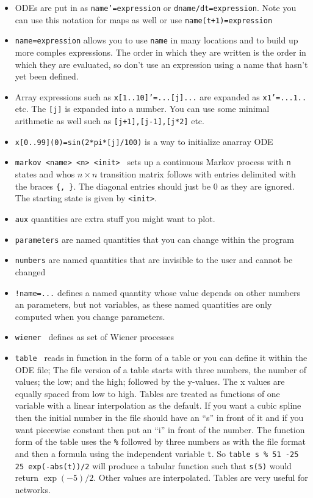 \begin{itemize}\itemsep -.05in
\item ODEs are put in as {\tt name'=expression} or {\tt dname/dt=expression}. Note you can use this notation for maps as well or use {\tt name(t+1)=expression}
\item {\tt name=expression} allows you to use {\tt name} in many locations and to build up more comples expressions. The order in which they are written is the order in which they are evaluated, so don't use an expression using a name that hasn't yet been defined.
\item Array expressions such as {\tt x[1..10]'=...[j]...} are expanded as {\tt x1'=...1..} etc. The {\tt [j]} is expanded into a number. You can use some minimal arithmetic as well such as {\tt [j+1],[j-1],[j*2]} etc. 
\item {\tt x[0..99](0)=sin(2*pi*[j]/100)} is a way to initialize anarray ODE    
\item {\tt markov <name> <n> <init> } sets up a continuous Markov process with {\tt n} states and whos $n\times n$ transition matrix follows with entries delimited with the braces {\tt \{, \}}. The diagonal entries should just be 0 as they are ignored. The starting state is given by {\tt <init>}.  
\item {\tt aux} quantities are extra stuff you might want to plot.
\item {\tt parameters} are named quantities that you can change within the program
\item {\tt numbers} are named quantities that are invisible to the user and cannot be changed
\item {\tt !name=...} defines a named quantity whose value depends on other numbers an parameters, but not variables, as these named quantities are only computed when you change parameters.       
\item {\tt wiener } defines as set of Wiener processes 
\item {\tt table } reads in function in the form of a table or you can define it within the ODE file; The file version of a table starts with three numbers, the number of values; the low; and the high; followed by the y-values.  The x values are equally spaced from low to high. Tables are treated as functions of one variable with a linear interpolation as the default. If you want a cubic spline then the initial number in the file should have an ``s'' in front of it and if you want piecewise constant then put an ``i'' in front of the number.  The function form of the table uses the {\tt \%} followed by three numbers as with the file format and then a formula using the independent variable {\tt t}. So {\tt table s \% 51 -25 25 exp(-abs(t))/2} will produce a tabular function such that {\tt s(5)} would return $\exp(-5)/2.$  Other values are interpolated. Tables are very useful for networks. 

\end{itemize}
